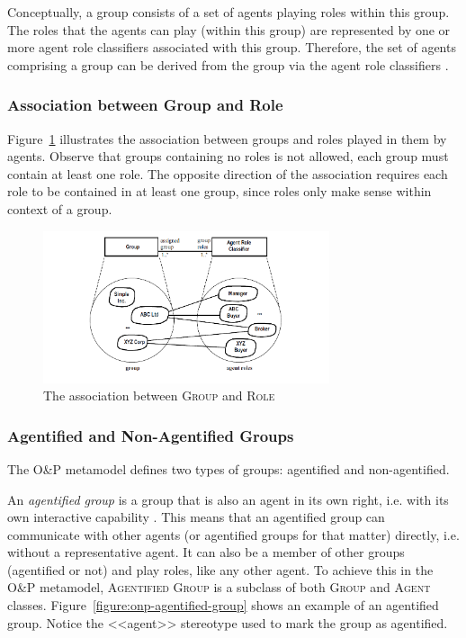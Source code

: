 Conceptually, a group consists of a set of agents playing roles within this group.
The roles that the agents can play (within this group) are represented by one or more agent role classifiers associated with this group.
Therefore, the set of agents comprising a group can be derived from the group via the agent role classifiers \cite{Odell05}.

\subsubsection*{Association between Group and Role}

Figure~\ref{figure:onp-group-role-association} illustrates the association between groups and roles played in them by agents.
Observe that groups containing no roles is not allowed, each group must contain at least one role.
The opposite direction of the association requires each role to be contained in at least one group, since roles only make sense within context of a group.

\begin{figure}[ht]
	\centering
	\includegraphics[width=0.75\textwidth]{images/onp-group-role-association.png}
	\caption{The association between \textsc{Group} and \textsc{Role}}
	\label{figure:onp-group-role-association}
\end{figure}

\subsubsection*{Agentified and Non-Agentified Groups}

The O\&P metamodel defines two types of groups: agentified and non-agentified.

An \textit{agentified group} is a group that is also an agent in its own right, i.e. with its own interactive capability \cite{Odell05}.
This means that an agentified group can communicate with other agents (or agentified groups for that matter) directly, i.e. without a representative agent.
It can also be a member of other groups (agentified or not) and play roles, like any other agent.
To achieve this in the O\&P metamodel, \textsc{Agentified Group} is a subclass of both \textsc{Group} and \textsc{Agent} classes.
Figure~\ref{figure:onp-agentified-group} shows an example of an agentified group.
Notice the <<agent>> stereotype used to mark the group as agentified.

